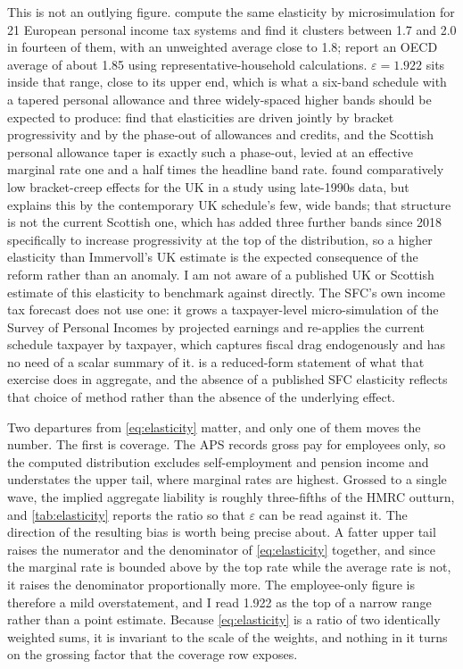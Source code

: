 This is not an outlying figure. \citet{garcia2026} compute the same elasticity by microsimulation for 21 European personal income tax systems and find it clusters between 1.7 and 2.0 in fourteen of them, with an unweighted average close to 1.8; \citet{price2015} report an OECD average of about 1.85 using representative-household calculations. $\varepsilon = 1.922$ sits inside that range, close to its upper end, which is what a six-band schedule with a tapered personal allowance and three widely-spaced higher bands should be expected to produce: \citet{garcia2026} find that elasticities are driven jointly by bracket progressivity and by the phase-out of allowances and credits, and the Scottish personal allowance taper is exactly such a phase-out, levied at an effective marginal rate one and a half times the headline band rate. \citet{immervoll2005} found comparatively low bracket-creep effects for the UK in a study using late-1990s data, but explains this by the contemporary UK schedule's few, wide bands; that structure is not the current Scottish one, which has added three further bands since 2018 specifically to increase progressivity at the top of the distribution, so a higher elasticity than Immervoll's UK estimate is the expected consequence of the reform rather than an anomaly. I am not aware of a published UK or Scottish estimate of this elasticity to benchmark against directly. The SFC's own income tax forecast does not use one: it grows a taxpayer-level micro-simulation of the Survey of Personal Incomes by projected earnings and re-applies the current schedule taxpayer by taxpayer, which captures fiscal drag endogenously and has no need of a scalar summary of it.  is a reduced-form statement of what that exercise does in aggregate, and the absence of a published SFC elasticity reflects that choice of method rather than the absence of the underlying effect.

Two departures from \cref{eq:elasticity} matter, and only one of them moves the number. The first is coverage. The APS records gross pay for employees only, so the computed distribution excludes self-employment and pension income and understates the upper tail, where marginal rates are highest. Grossed to a single wave, the implied aggregate liability is roughly three-fifths of the HMRC outturn, and \cref{tab:elasticity} reports the ratio so that $\varepsilon$ can be read against it. The direction of the resulting bias is worth being precise about. A fatter upper tail raises the numerator and the denominator of \cref{eq:elasticity} together, and since the marginal rate is bounded above by the top rate while the average rate is not, it raises the denominator proportionally more. The employee-only figure is therefore a mild overstatement, and I read 1.922 as the top of a narrow range rather than a point estimate. Because \cref{eq:elasticity} is a ratio of two identically weighted sums, it is invariant to the scale of the weights, and nothing in it turns on the grossing factor that the coverage row exposes.

